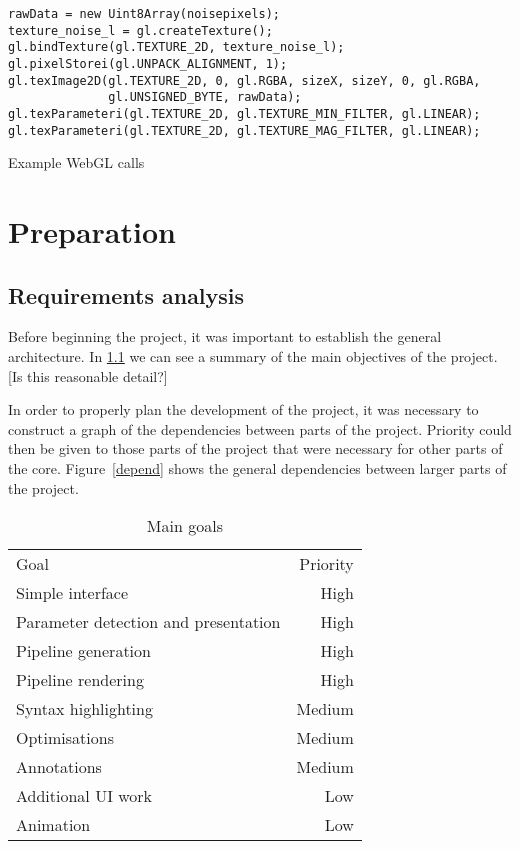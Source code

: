 \documentclass[12pt,twoside,notitlepage]{report}
\begin{document}
\begin{listing}[H]
\label{ugly}
\begin{verbatim}
rawData = new Uint8Array(noisepixels);
texture_noise_l = gl.createTexture();
gl.bindTexture(gl.TEXTURE_2D, texture_noise_l);
gl.pixelStorei(gl.UNPACK_ALIGNMENT, 1);
gl.texImage2D(gl.TEXTURE_2D, 0, gl.RGBA, sizeX, sizeY, 0, gl.RGBA, 
              gl.UNSIGNED_BYTE, rawData);
gl.texParameteri(gl.TEXTURE_2D, gl.TEXTURE_MIN_FILTER, gl.LINEAR);
gl.texParameteri(gl.TEXTURE_2D, gl.TEXTURE_MAG_FILTER, gl.LINEAR);
\end{verbatim}
\caption{Example WebGL calls}
\end{listing}

\cleardoublepage
\chapter{Preparation}

\section{Requirements analysis}
Before beginning the project, it was important to establish the general architecture. In \ref{goals} we can see a summary of the main objectives of the project. [Is this reasonable detail?]

In order to properly plan the development of the project, it was necessary to construct a graph of the dependencies between parts of the project. Priority could then be given to those parts of the project that were necessary for other parts of the core. Figure~\ref{depend} shows the general dependencies between larger parts of the project. 
\begin{table}
\label{goals}
\begin{tabular}{l | r}
Goal & Priority \\
Simple interface & High \\
Parameter detection and presentation & High \\
Pipeline generation & High \\
Pipeline rendering & High \\
Syntax highlighting & Medium \\
Optimisations & Medium \\
Annotations & Medium \\
Additional UI work & Low \\
Animation & Low \\
\end{tabular}
\caption{Main goals}
\end{table}
\end{document}

